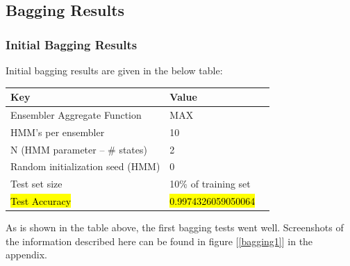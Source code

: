 \documentclass[12pt]{article}
\begin{document}
\subsection{Bagging Results}
  \subsubsection{Initial Bagging Results}
  Initial bagging results are given in the below table:
  \begin{table}[H]
    \centering
  \begin{tabular}{|l|l|l|}
    \hline \textbf{Key} & \textbf{Value} \\\hline \hline
    Ensembler Aggregate Function & \textsc{MAX}  \\ \hline
    HMM's per ensembler & 10 \\ \hline
    N (HMM parameter -- \# states) & 2 \\ \hline
    Random initialization seed (HMM) & 0 \\ \hline
    Test set size  & 10\% of training set \\ \hline
  \hl{Test Accuracy} & \hl{0.9974326059050064}  \\ \hline
  \end{tabular}
  \end{table}
  As is shown in the table above, the first bagging tests went well. Screenshots of the information described here can be found in figure [\ref{bagging1}] in the appendix.
\end{document}
